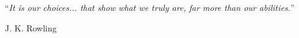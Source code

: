 
\vspace*{0.2\textheight}

\noindent\enquote{\itshape It is our choices... that show what we truly are, far more than our abilities.}\bigbreak

\hfill J. K. Rowling